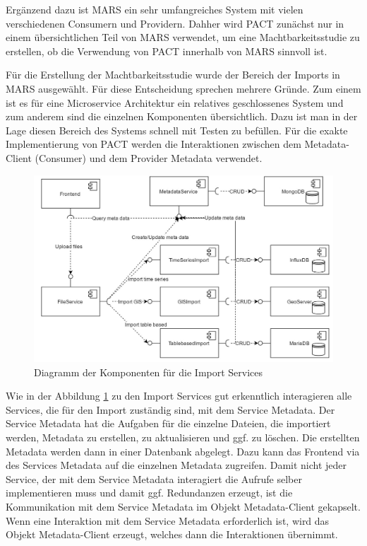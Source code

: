 \documentclass{llncs}
\begin{document}
Ergänzend dazu ist MARS ein sehr umfangreiches System mit vielen verschiedenen Consumern und Providern. Dahher wird PACT zunächst nur in einem übersichtlichen Teil von MARS verwendet, um eine Machtbarkeitsstudie zu erstellen, ob die Verwendung von PACT innerhalb von MARS sinnvoll ist.

Für die Erstellung der Machtbarkeitsstudie wurde der Bereich der Imports in MARS ausgewählt. Für diese Entscheidung sprechen mehrere Gründe. Zum einem ist es für eine Microservice Architektur ein relatives geschlossenes System und zum anderem sind die einzelnen Komponenten übersichtlich. Dazu ist man in der Lage diesen Bereich des Systems schnell mit Testen zu befüllen. Für die exakte Implementierung von PACT werden die Interaktionen zwischen dem Metadata-Client (Consumer) und dem Provider Metadata verwendet.

\begin{figure}[htbp]
  \centering
      \includegraphics[width=1\textwidth]{./Images/ImportServices}
    \caption{Diagramm der Komponenten für die Import Services}
    \label{fig:ImportServices}
\end{figure}

Wie in der Abbildung \ref{fig:ImportServices} zu den Import Services gut erkenntlich interagieren alle Services, die für den Import zuständig sind, mit dem Service Metadata. Der Service Metadata hat die Aufgaben für die einzelne Dateien, die importiert werden, Metadata zu erstellen, zu aktualisieren und ggf. zu löschen. Die erstellten Metadata werden dann in einer Datenbank abgelegt. Dazu kann das Frontend via des Services Metadata auf die einzelnen Metadata zugreifen. Damit nicht jeder Service, der mit dem Service Metadata interagiert die Aufrufe selber implementieren muss und damit ggf. Redundanzen erzeugt, ist die Kommunikation mit dem Service Metadata im Objekt Metadata-Client gekapselt. Wenn eine Interaktion mit dem Service Metadata erforderlich ist, wird das Objekt Metadata-Client erzeugt, welches dann die Interaktionen übernimmt.
\end{document}
